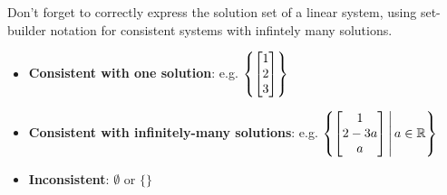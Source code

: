 \begin{applicationActivities}
\begin{remark}
Don't forget to correctly express the solution set of a linear system,
using set-builder notation for consistent systems with
infintely many solutions.
  \begin{itemize}
  \item \textbf{Consistent with one solution}: e.g.
        \(\left\{ \begin{bmatrix}1\\2\\3\end{bmatrix} \right\}\)
  \item \textbf{Consistent with infinitely-many solutions}: e.g.
        \(
          \left\{
            \begin{bmatrix}1\\2-3a\\a\end{bmatrix}
          \,\middle|\,
            a\in\mathbb{R}
          \right\}
        \)
  \item \textbf{Inconsistent}: \(\emptyset\) or \(\{\}\)
  \end{itemize}
\end{remark}

\end{applicationActivities}

